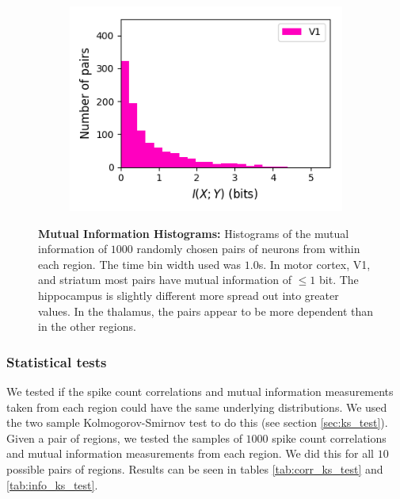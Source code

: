 \documentclass[a4paper,12pt]{article}
\theoremstyle{definition}
\begin{document}
\begin{figure}[p]
\begin{subfigure}{0.5\textwidth}
    \includegraphics[width=\textwidth]{figures/all_v1_6_1p0_information_histogram.png}
  \end{subfigure}
  \caption{\textbf{Mutual Information Histograms:} Histograms of the mutual information of $1000$ randomly chosen pairs of neurons from within each region. The time bin width used was $1.0$s. In motor cortex, V1, and striatum most pairs have mutual information of $\leq 1$ bit. The hippocampus is slightly different more spread out into greater values. In the thalamus, the pairs appear to be more dependent than in the other regions.}
  \label{fig:all_info_histograms}
\end{figure}

\subsubsection{Statistical tests}
We tested if the spike count correlations and mutual information measurements taken from each region could have the same underlying distributions. We used the two sample Kolmogorov-Smirnov test to do this (see section \ref{sec:ks_test}). Given a pair of regions, we tested the samples of $1000$ spike count correlations and mutual information measurements from each region. We did this for all $10$ possible pairs of regions. Results can be seen in tables \ref{tab:corr_ks_test} and \ref{tab:info_ks_test}.
\end{document}
